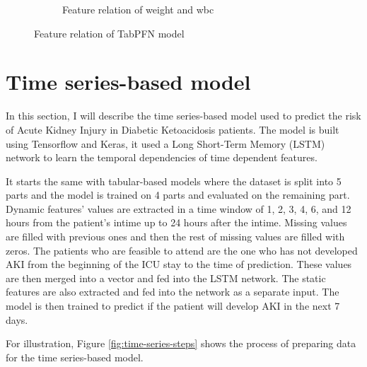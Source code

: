 \documentclass[../main.tex]{subfiles}
\begin{document}
\begin{figure}
\begin{subfigure}{0.45\textwidth}
        \caption{Feature relation of weight and wbc}
        \label{fig:tabpfn-weight-wbc}
    \end{subfigure}

    \caption{Feature relation of TabPFN model}
    \label{fig:tabpfn-feature-relation}
\end{figure}


\section{Time series-based model}

In this section, I will describe the time series-based model used to predict the risk of Acute Kidney Injury in Diabetic Ketoacidosis patients.
The model is built using Tensorflow and Keras, it used a Long Short-Term Memory (LSTM) network to learn the temporal dependencies of time dependent features.

It starts the same with tabular-based models where the dataset is split into 5 parts and the model is trained on 4 parts and evaluated on the remaining part.
Dynamic features' values are extracted in a time window of 1, 2, 3, 4, 6, and 12 hours from the patient's intime up to 24 hours after the intime.
Missing values are filled with previous ones and then the rest of missing values are filled with zeros.
The patients who are feasible to attend are the one who has not developed AKI from the beginning of the ICU stay to the time of prediction.
These values are then merged into a vector and fed into the LSTM network.
The static features are also extracted and fed into the network as a separate input.
The model is then trained to predict if the patient will develop AKI in the next 7 days.

For illustration, Figure \ref{fig:time-series-steps} shows the process of preparing data for the time series-based model.
\end{document}
